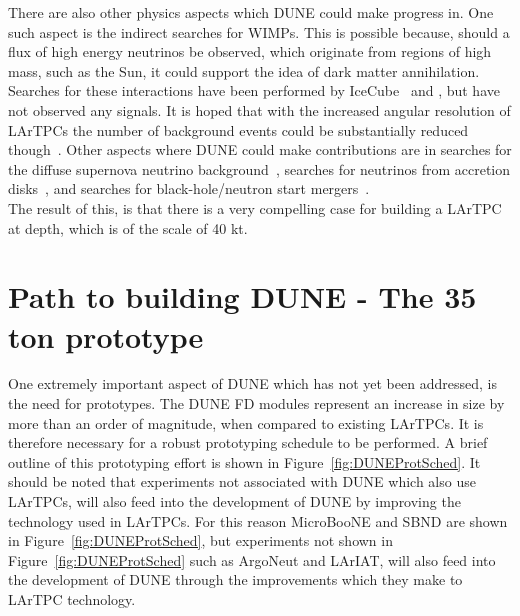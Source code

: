 There are also other physics aspects which DUNE could make progress in. One such aspect is the indirect searches for WIMPs. This is possible because, should a flux of high energy neutrinos be observed, which originate from regions of high mass, such as the Sun, it could support the idea of dark matter annihilation. Searches for these interactions have been performed by IceCube~\citep{Aartsen:2012kia} and \citep{Choi:2015ara}, but have not observed any signals. It is hoped that with the increased angular resolution of LArTPCs the number of background events could be substantially reduced though~\citep{DUNECDR_V2}. Other aspects where DUNE could make contributions are in searches for the diffuse supernova neutrino background~\citep{Beacom:2010kk}, searches for neutrinos from accretion disks~\citep{Caballero:2011dw}, and searches for black-hole/neutron start mergers~\citep{Caballero:2009ww}. \\

The result of this, is that there is a very compelling case for building a LArTPC at depth, which is of the scale of 40 kt.\\

\section{Path to building DUNE - The 35 ton prototype} \label{sec:The35tonDetector}  %
One extremely important aspect of DUNE which has not yet been addressed, is the need for prototypes. The DUNE FD modules represent an increase in size by more than an order of magnitude, when compared to existing LArTPCs. It is therefore necessary for a robust prototyping schedule to be performed. A brief outline of this prototyping effort is shown in Figure~\ref{fig:DUNEProtSched}. It should be noted that experiments not associated with DUNE which also use LArTPCs, will also feed into the development of DUNE by improving the technology used in LArTPCs. For this reason MicroBooNE and SBND are shown in Figure~\ref{fig:DUNEProtSched}, but experiments not shown in Figure~\ref{fig:DUNEProtSched} such as ArgoNeut and LArIAT, will also feed into the development of DUNE through the improvements which they make to LArTPC technology. \\


